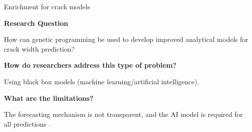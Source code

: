 \begin{frame}{Enrichment for crack models}

\justifying

\textbf{Research Question}

How can genetic programming be used to develop improved analytical models for crack width prediction?

\vspace{0.20cm}

\textbf{How do researchers address this type of problem?}

Using black box models (machine learning/artificial intelligence).

\vspace{0.20cm}

\textbf{What are the limitations?}

The forecasting mechanism is not transparent, and the AI model is required for all predictions \cite{zhang_explainable_2025}.

\end{frame}
